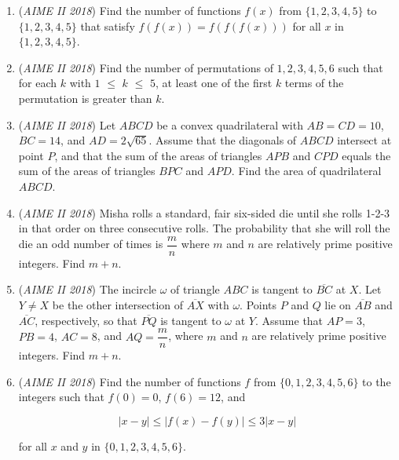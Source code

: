 \begin{enumerate}
	\item (\textit{AIME II 2018}) Find the number of functions $f(x)$ from $\{1, 2, 3, 4, 5\}$ to $\{1, 2, 3, 4, 5\}$ that satisfy $f(f(x)) = f(f(f(x)))$ for all $x$ in $\{1, 2, 3, 4, 5\}$.


 

	\item (\textit{AIME II 2018}) Find the number of permutations of $1, 2, 3, 4, 5, 6$ such that for each $k$ with $1$ $\leq$ $k$ $\leq$ $5$, at least one of the first $k$ terms of the permutation is greater than $k$.


 

	\item (\textit{AIME II 2018}) Let $ABCD$ be a convex quadrilateral with $AB = CD = 10$, $BC = 14$, and $AD = 2\sqrt{65}$. Assume that the diagonals of $ABCD$ intersect at point $P$, and that the sum of the areas of triangles $APB$ and $CPD$ equals the sum of the areas of triangles $BPC$ and $APD$. Find the area of quadrilateral $ABCD$.


 

	\item (\textit{AIME II 2018}) Misha rolls a standard, fair six-sided die until she rolls 1-2-3 in that order on three consecutive rolls. The probability that she will roll the die an odd number of times is $\dfrac{m}{n}$ where $m$ and $n$ are relatively prime positive integers. Find $m+n$.


 

	\item (\textit{AIME II 2018}) The incircle $\omega$ of triangle $ABC$ is tangent to $\overline{BC}$ at $X$. Let $Y \neq X$ be the other intersection of $\overline{AX}$ with $\omega$. Points $P$ and $Q$ lie on $\overline{AB}$ and $\overline{AC}$, respectively, so that $\overline{PQ}$ is tangent to $\omega$ at $Y$. Assume that $AP = 3$, $PB = 4$, $AC = 8$, and $AQ = \dfrac{m}{n}$, where $m$ and $n$ are relatively prime positive integers. Find $m+n$.


 

	\item (\textit{AIME II 2018}) Find the number of functions $f$ from $\{0, 1, 2, 3, 4, 5, 6\}$ to the integers such that $f(0) = 0$, $f(6) = 12$, and


 
 \[|x - y|  \leq  |f(x) - f(y)|  \leq  3|x - y|\]


 for all $x$ and $y$ in $\{0, 1, 2, 3, 4, 5, 6\}$.


 

\end{enumerate}